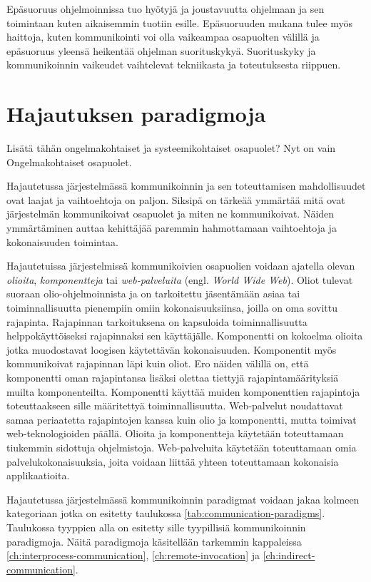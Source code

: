 Epäsuoruus ohjelmoinnissa tuo hyötyjä ja joustavuutta ohjelmaan ja sen toimintaan kuten aikaisemmin tuotiin esille. Epäsuoruuden mukana tulee myös haittoja, kuten kommunikointi voi olla vaikeampaa osapuolten välillä ja epäsuoruus yleensä heikentää ohjelman suorituskykyä. Suorituskyky ja kommunikoinnin vaikeudet vaihtelevat tekniikasta ja toteutuksesta riippuen.

\section{Hajautuksen paradigmoja}
\begin{it}
	Lisätä tähän ongelmakohtaiset ja systeemikohtaiset osapuolet? Nyt on vain Ongelmakohtaiset osapuolet.
\end{it}
Hajautetussa järjestelmässä kommunikoinnin ja sen toteuttamisen mahdollisuudet ovat laajat ja vaihtoehtoja on paljon. Siksipä on tärkeää ymmärtää mitä ovat järjestelmän kommunikoivat osapuolet ja miten ne kommunikoivat. Näiden ymmärtäminen auttaa kehittäjää paremmin hahmottamaan vaihtoehtoja ja kokonaisuuden toimintaa.

Hajautetuissa järjestelmissä kommunikoivien osapuolien voidaan ajatella olevan \emph{olioita}, \emph{komponentteja} tai \emph{web-palveluita} (engl. \emph{World Wide Web}). Oliot tulevat suoraan olio-ohjelmoinnista ja on tarkoitettu jäsentämään asiaa tai toiminnallisuutta pienempiin omiin kokonaisuuksiinsa, joilla on oma sovittu rajapinta. Rajapinnan tarkoituksena on kapsuloida toiminnallisuutta helppokäyttöiseksi rajapinnaksi sen käyttäjälle. Komponentti on kokoelma olioita jotka muodostavat loogisen käytettävän kokonaisuuden. Komponentit myös kommunikoivat rajapinnan läpi kuin oliot. Ero näiden välillä on, että komponentti oman rajapintansa lisäksi olettaa tiettyjä rajapintamäärityksiä muilta komponenteilta. Komponentti käyttää muiden komponenttien rajapintoja toteuttaakseen sille määritettyä toiminnallisuutta. Web-palvelut noudattavat samaa periaatetta rajapintojen kanssa kuin olio ja komponentti, mutta toimivat web-teknologioiden päällä. Olioita ja komponentteja käytetään toteuttamaan tiukemmin sidottuja ohjelmistoja. Web-palveluita käytetään toteuttamaan omia palvelukokonaisuuksia, joita voidaan liittää yhteen toteuttamaan kokonaisia applikaatioita. \mbox{\cite[s.~42--43]{distributed-systems-concepts-and-design}}

Hajautetussa järjestelmässä kommunikoinnin paradigmat voidaan jakaa kolmeen kategoriaan jotka on esitetty taulukossa \ref{tab:communication-paradigms}. Taulukossa tyyppien alla on esitetty sille tyypillisiä kommunikoinnin paradigmoja. Näitä paradigmoja käsitellään tarkemmin kappaleissa \ref{ch:interprocess-communication}, \ref{ch:remote-invocation} ja \ref{ch:indirect-communication}.

